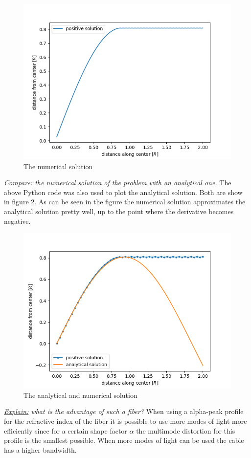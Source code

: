 \documentclass{article}
\begin{document}
\begin{figure}[h!]
	\centering
	\includegraphics[width=0.55\linewidth,keepaspectratio]{afbeeldingen/numerical_solution.png}
	\caption{The numerical solution}
	\label{fig:numersolut}
\end{figure}

\textit{\underline{Compare:} the numerical solution of the problem with an analytical one.}
The above Python code was also used to plot the analytical solution. Both are show in figure \ref{fig:bothsolutions}. As can be seen in the figure the numerical solution approximates the analytical solution pretty well, up to the point where the derivative becomes negative.\\

\begin{figure}[h!]
	\centering
	\includegraphics[width=0.55\linewidth,keepaspectratio]{afbeeldingen/numerical_and_analytical.png}
	\caption{The analytical and numerical solution}
	\label{fig:bothsolutions}
\end{figure}

\textit{\underline{Explain:} what is the advantage of such a fiber?}
When using a alpha-peak profile for the refractive index of the fiber it is possible to use more modes of light more efficiently since for a certain shape factor $\alpha$ the multimode distortion for this profile is the smallest possible. When more modes of light can be used the cable has a higher bandwidth.
\end{document}

